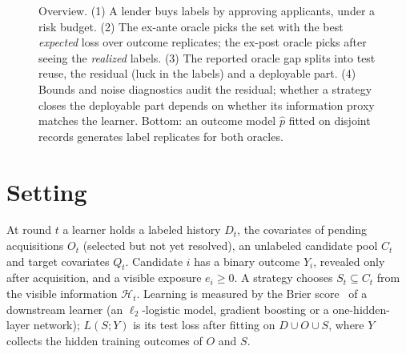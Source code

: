 \documentclass[runningheads]{llncs}
\begin{document}
\begin{figure}[t]
 \centering
 \resizebox{\linewidth}{!}{}
 \caption{Overview. (1) A lender buys labels by approving applicants, under a risk budget. (2) The ex-ante oracle picks the set with the best \emph{expected} loss over outcome replicates; the ex-post oracle picks after seeing the \emph{realized} labels. (3) The reported oracle gap splits into test reuse, the residual (luck in the labels) and a deployable part. (4) Bounds and noise diagnostics audit the residual; whether a strategy closes the deployable part depends on whether its information proxy matches the learner. Bottom: an outcome model $\hat p$ fitted on disjoint records generates label replicates for both oracles.}
 \label{fig:framework}
\end{figure}

\section{Setting}
\label{sec:setting}
At round $t$ a learner holds a labeled history $D_t$, the covariates of pending acquisitions $O_t$ (selected but not yet resolved), an unlabeled candidate pool $C_t$ and target covariates $Q_t$. Candidate $i$ has a binary outcome $Y_i$, revealed only after acquisition, and a visible exposure $e_i\ge0$. A strategy chooses $S_t\subseteq C_t$ from the visible information $\mathcal H_t$. Learning is measured by the Brier score~\cite{brier1950verification} of a downstream learner (an $\ell_2$-logistic model, gradient boosting or a one-hidden-layer network); $L(S;Y)$ is its test loss after fitting on $D\cup O\cup S$, where $Y$ collects the hidden training outcomes of $O$ and $S$.
\end{document}

